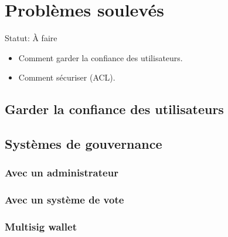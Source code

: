 \section{Problèmes soulevés}

Statut: À faire
\begin{itemize}
    \item Comment garder la confiance des utilisateurs.
    \item Comment sécuriser (ACL).
\end{itemize}


\subsection{Garder la confiance des utilisateurs}

\subsection{Systèmes de gouvernance}

\subsubsection{Avec un administrateur}

\subsubsection{Avec un système de vote}

\subsubsection{Multisig wallet}

